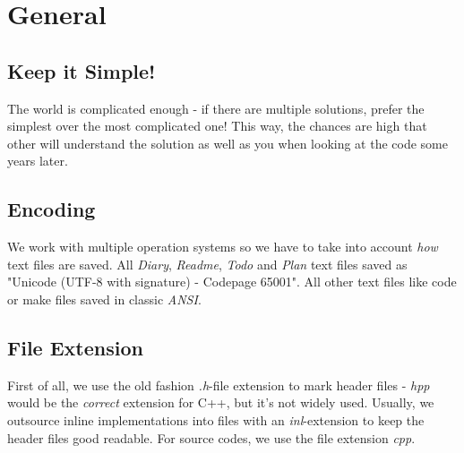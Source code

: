 \chapter{General}




\section{Keep it Simple!}
The world is complicated enough - if there are multiple solutions, prefer the simplest over the most complicated one! This way, the chances are high that other will understand the solution as well as you when looking at the code some years later.




\section{Encoding}
We work with multiple operation systems so we have to take into account \emph{how} text files are saved. All \emph{Diary}, \emph{Readme}, \emph{Todo} and \emph{Plan} text files saved as "Unicode (UTF-8 with signature) - Codepage 65001". All other text files like code or make files saved in classic \emph{ANSI}.




\section{File Extension}
First of all, we use the old fashion \emph{.h}-file extension to mark header files - \emph{hpp} would be the \emph{correct} extension for C++, but it's not widely used. Usually, we outsource inline implementations into files with an \emph{inl}-extension to keep the header files good readable. For source codes, we use the file extension \emph{cpp}.




